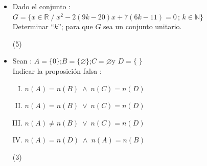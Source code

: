 \documentclass[11pt, twocolumn, landscape, a4paper]{article}
\begin{document}
\begin{itemize}
{\begin{tasks}(3)
\end{tasks}
}
\item{Dado el conjunto : $G = \big\{x \in \mathbb{R}\;/\;x^{2} - 2(9k - 20)x + 7(6k - 11) = 0\,;\, k \in \mathbb{N}\big\}$ \\ Determinar ``$k$''; para que $G$ sea un conjunto unitario.
\begin{tasks}(5)
\end{tasks}
}
\item{
Sean : $A = \{0\}$;\quad $B = \{\varnothing\}$;\quad $C = \varnothing$\quad y \quad$D = \{\;\}$ \\ Indicar la proposición falsa :
\begin{enumerate}[I.]
\item{$n(A) = n(B)\;\wedge\;n(C) = n(D)$}
\item{$n(A) = n(B)\;\vee\;n(C) = n(D)$}
\item{$n(A) \neq n(B)\;\vee\;n(C) = n(D)$}
\item{$n(A) = n(D)\;\wedge\;n(A) = n(B)$}
\end{enumerate}
\begin{tasks}(3)
\end{tasks} 
}
\end{itemize}
\end{document}
